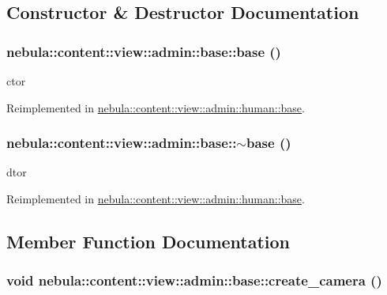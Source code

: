 \subsection{Constructor \& Destructor Documentation}
\hypertarget{classnebula_1_1content_1_1view_1_1admin_1_1base_a42c5f438bf2b5a658aaa1849e8a1be1c}{
\subsubsection[{base}]{\setlength{\rightskip}{0pt plus 5cm}nebula::content::view::admin::base::base ()}}
\label{classnebula_1_1content_1_1view_1_1admin_1_1base_a42c5f438bf2b5a658aaa1849e8a1be1c}


ctor 

Reimplemented in \hyperlink{classnebula_1_1content_1_1view_1_1admin_1_1human_1_1base_a681eda36fa571b801d5369f2834ca119}{nebula::content::view::admin::human::base}.\hypertarget{classnebula_1_1content_1_1view_1_1admin_1_1base_adf0b4240e57271d4f381cde906367633}{
\subsubsection[{$\sim$base}]{\setlength{\rightskip}{0pt plus 5cm}nebula::content::view::admin::base::$\sim$base ()}}
\label{classnebula_1_1content_1_1view_1_1admin_1_1base_adf0b4240e57271d4f381cde906367633}


dtor 

Reimplemented in \hyperlink{classnebula_1_1content_1_1view_1_1admin_1_1human_1_1base_a93ed0174628fa1e1cb7c08986ae7131c}{nebula::content::view::admin::human::base}.

\subsection{Member Function Documentation}
\hypertarget{classnebula_1_1content_1_1view_1_1admin_1_1base_ad1325929fa62c561c9546bf7b92c330d}{
\subsubsection[{create\_\-camera}]{\setlength{\rightskip}{0pt plus 5cm}void nebula::content::view::admin::base::create\_\-camera ()}}
\label{classnebula_1_1content_1_1view_1_1admin_1_1base_ad1325929fa62c561c9546bf7b92c330d}



